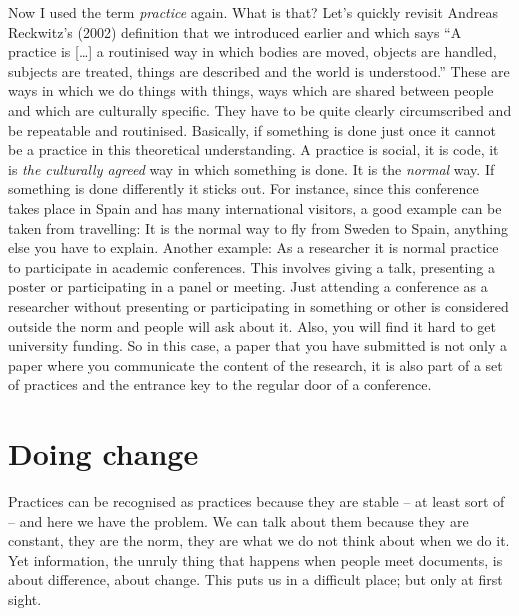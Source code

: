 \documentclass[a4paper,
fontsize=11pt,
oneside,
numbers=noperiodatend,
parskip=half-,
bibliography=totoc,
final
]{scrartcl}
\begin{document}
Now I used the term \emph{practice} again. What is that? Let's quickly
revisit Andreas Reckwitz's (2002) definition that we introduced earlier
and which says \enquote{A practice is {[}\ldots{}{]} a routinised way in
which bodies are moved, objects are handled, subjects are treated,
things are described and the world is understood.} These are ways in
which we do things with things, ways which are shared between people and
which are culturally specific. They have to be quite clearly
circumscribed and be repeatable and routinised. Basically, if something
is done just once it cannot be a practice in this theoretical
understanding. A practice is social, it is code, it is \emph{the
culturally agreed} way in which something is done. It is the
\emph{normal} way. If something is done differently it sticks out. For
instance, since this conference takes place in Spain and has many
international visitors, a good example can be taken from travelling: It
is the normal way to fly from Sweden to Spain, anything else you have to
explain. Another example: As a researcher it is normal practice to
participate in academic conferences. This involves giving a talk,
presenting a poster or participating in a panel or meeting. Just
attending a conference as a researcher without presenting or
participating in something or other is considered outside the norm and
people will ask about it. Also, you will find it hard to get university
funding. So in this case, a paper that you have submitted is not only a
paper where you communicate the content of the research, it is also part
of a set of practices and the entrance key to the regular door of a
conference.

\section*{Doing change}\label{doing-change}

Practices can be recognised as practices because they are stable -- at
least sort of -- and here we have the problem. We can talk about them
because they are constant, they are the norm, they are what we do not
think about when we do it. Yet information, the unruly thing that
happens when people meet documents, is about difference, about change.
This puts us in a difficult place; but only at first sight.
\end{document}
